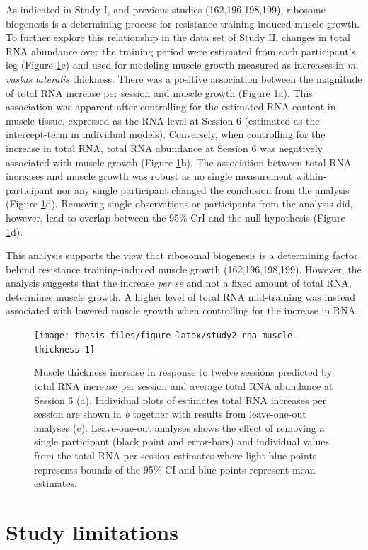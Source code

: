 \documentclass[twoside,10pt]{gihclass} %
\begin{document}
As indicated in Study I, and previous studies
(162,196,198,199),
ribosome biogenesis is a determining process for resistance training-induced muscle growth.
To further explore this relationship in the data set of Study II, changes in total RNA abundance over the training period were estimated from each participant's leg (Figure \ref{fig:study2-rna-muscle-thickness}c) and used for modeling muscle growth measured as increases in \emph{m. vastus lateralis} thickness.
There was a positive association between the magnitude of total RNA increase per session and muscle growth (Figure \ref{fig:study2-rna-muscle-thickness}a).
This association was apparent after controlling for the estimated RNA content in muscle tissue, expressed as the RNA level at Session 6 (estimated as the intercept-term in individual models). Conversely, when controlling for the increase in total RNA, total RNA abundance at Session 6 was negatively associated with muscle growth (Figure \ref{fig:study2-rna-muscle-thickness}b).
The association between total RNA increases and muscle growth was robust as no single measurement within-participant nor any single participant changed the conclusion from the analysis (Figure \ref{fig:study2-rna-muscle-thickness}d). Removing single observations or participants from the analysis did, however, lead to overlap between the 95\% CrI and the null-hypothesis (Figure \ref{fig:study2-rna-muscle-thickness}d).

This analysis supports the view that ribosomal biogenesis is a determining factor behind resistance training-induced muscle growth
(162,196,198,199).
However, the analysis suggests that the increase \emph{per se} and not a fixed amount of total RNA, determines muscle growth.
A higher level of total RNA mid-training was instead associated with lowered muscle growth when controlling for the increase in RNA.
\begin{figure}

{\centering \texttt{[image: thesis\_files/figure-latex/study2-rna-muscle-thickness-1]} 

}

\caption[Relationship between total RNA and muscle hypertrophy in Study II]{Muscle thickness increase in response to twelve sessions predicted by total RNA increase per session and average total RNA abundance at Session 6 (a). Individual plots of estimates total RNA increases per session are shown in \textit{b} together with results from leave-one-out analyses (c). Leave-one-out analyses shows the effect of removing a single participant (black point and error-bars) and individual values from the total RNA per session estimates where light-blue points represents bounds of the 95\% CI and blue points represent mean estimates.}\label{fig:study2-rna-muscle-thickness}
\end{figure}
\hypertarget{study-limitations}{%
\section{Study limitations}\label{study-limitations}}
\end{document}
